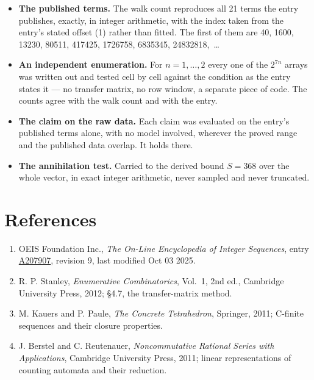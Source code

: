 \documentclass[11pt]{article}
\theoremstyle{definition}
\begin{document}
\begin{itemize}

\item {\bfseries The published terms.} The walk count reproduces all 21 terms the entry publishes, exactly, in integer arithmetic, with the index taken from the entry's stated offset (1) rather than fitted. The first of them are 40, 1600, 13230, 80511, 417425, 1726758, 6835345, 24832818,~\dots

\item {\bfseries An independent enumeration.} For $n = 1,\dots,2$ every one of the $2^{7n}$ arrays was written out and tested cell by cell against the condition as the entry states it --- no transfer matrix, no row window, a separate piece of code. The counts agree with the walk count and with the entry.

\item {\bfseries The claim on the raw data.} Each claim was evaluated on the entry's published terms alone, with no model involved, wherever the proved range and the published data overlap. It holds there.

\item {\bfseries The annihilation test.} Carried to the derived bound $S = 368$ over the whole vector, in exact integer arithmetic, never sampled and never truncated.

\end{itemize}

\section{References}

\begin{enumerate}

\item OEIS Foundation Inc., \emph{The On-Line Encyclopedia of Integer Sequences}, entry \href{https://oeis.org/A207907}{A207907}, revision 9, last modified Oct 03 2025.

\item R. P. Stanley, \emph{Enumerative Combinatorics}, Vol.~1, 2nd ed., Cambridge University Press, 2012; \S4.7, the transfer-matrix method.

\item M. Kauers and P. Paule, \emph{The Concrete Tetrahedron}, Springer, 2011; C-finite sequences and their closure properties.

\item J. Berstel and C. Reutenauer, \emph{Noncommutative Rational Series with Applications}, Cambridge University Press, 2011; linear representations of counting automata and their reduction.

\end{enumerate}
\end{document}
